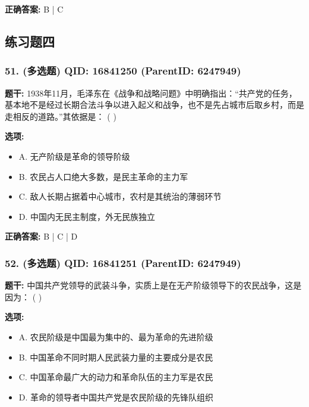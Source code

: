 \documentclass[12pt,UTF8]{ctexart}
\begin{document}
\textbf{正确答案:}
B | C

\vspace{0.3em}\hrulefill\vspace{0.7em}

\subsection*{练习题四}

\subsubsection*{51. (多选题) \small QID: 16841250 (ParentID: 6247949)}

\textbf{题干:}
1938年11月，毛泽东在《战争和战略问题》中明确指出：“共产党的任务，基本地不是经过长期合法斗争以进入起义和战争，也不是先占城市后取乡村，而是走相反的道路。”其依据是： ( )



\textbf{选项:}
\begin{itemize}[leftmargin=*]

  \item A. 无产阶级是革命的领导阶级

  \item B. 农民占人口绝大多数，是民主革命的主力军

  \item C. 敌人长期占据着中心城市，农村是其统治的薄弱环节

  \item D. 中国内无民主制度，外无民族独立

\end{itemize}

\textbf{正确答案:}
B | C | D

\vspace{0.3em}\hrulefill\vspace{0.7em}

\subsubsection*{52. (多选题) \small QID: 16841251 (ParentID: 6247949)}

\textbf{题干:}
中国共产党领导的武装斗争，实质上是在无产阶级领导下的农民战争，这是因为： ( )



\textbf{选项:}
\begin{itemize}[leftmargin=*]

  \item A. 农民阶级是中国最为集中的、最为革命的先进阶级

  \item B. 中国革命不同时期人民武装力量的主要成分是农民

  \item C. 中国革命最广大的动力和革命队伍的主力军是农民

  \item D. 革命的领导者中国共产党是农民阶级的先锋队组织

\end{itemize}
\end{document}
